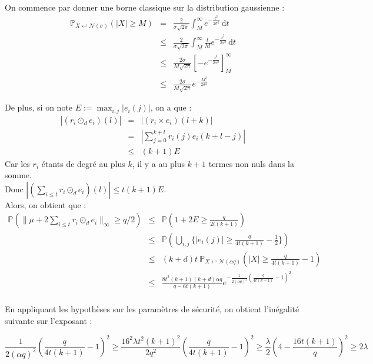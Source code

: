 \documentclass[11pt,a4paper]{article}
\begin{document}
On commence par donner une borne classique sur la distribution gaussienne : 
\begin{eqnarray*}
\mathbb{P}_{X \hookleftarrow \mathcal{N}(\sigma)}(|X| \geq M) &=& \frac{2}{\sigma \sqrt{2 \pi}} \int_{M}^\infty e^{-\frac{t^2}{2 \sigma^2}} \, \mathrm{d}t \\
&\leq &  \frac{2}{\sigma \sqrt{2 \pi}}\int_{M}^\infty \frac{t}{M} e^{-\frac{t^2}{2 \sigma^2}} \, \mathrm{d}t \\
& \leq & \frac{2\sigma}{M \sqrt{2 \pi}} [-e^{-\frac{t^2}{2 \sigma^2}}]_M^\infty \\
& \leq & \frac{2\sigma}{M \sqrt{2 \pi}} e^{-\frac{M^2}{2 \sigma^2}}
\end{eqnarray*}


De plus, si on note $E := \max_{i,j} |e_i(j)|$, on a que :  \\
\begin{eqnarray*}
|(r_i \odot_d e_i)(l)| &=& |(r_i\times e_i)(l+k)| \\
&=& |\sum_{j=0}^{k+l}r_i(j)e_i(k+l-j)| \\
&\leq& (k+1)E
\end{eqnarray*}
Car les $r_i$ étants de degré au plus $k$, il y a au plus $k+1$ termes non nuls dans la somme.\\

Donc $|(\sum_{i \leq t}r_i \odot_d e_i)(l)|\leq t(k+1)E$. \\

Alors, on obtient que : 
\begin{eqnarray*}
\mathbb{P}(\|\mu + 2\sum_{i \leq t}r_i \odot_d e_i  \|_\infty \geq q/2 ) &\leq& \mathbb{P}(1+2E \geq \frac{q}{2t(k+1)}) \\
&\leq& \mathbb{P}(\bigcup_{i,j} \{ |e_i(j)| \geq \frac{q}{4t(k+1)} - \frac{1}{2} \} ) \\
&\leq& (k+d)t \ \mathbb{P}_{X \hookleftarrow \mathcal{N}(\alpha q)}(|X| \geq \frac{q}{4t(k+1)} - 1) \\
&\leq& \frac{8t^2(k+1)(k+d)\alpha q}{q - 6t(k+1)} e^{-\frac{1}{2(\alpha q)^2}(\frac{q}{4t(k+1)}-1)^2} \\
\end{eqnarray*}

En appliquant les hypothèses sur les paramètres de sécurité, on obtient l'inégalité suivante sur l'exposant :

\[
\frac{1}{2(\alpha q)^2}(\frac{q}{4t(k+1)}-1)^2 \geq \frac{16^2\lambda t^2(k+1)^2}{2q^2}(\frac{q}{4t(k+1)}-1)^2 
\geq \frac{\lambda}{2}(4-\frac{16t(k+1)}{q})^2
\geq 2\lambda
\]
\\
\end{document}
